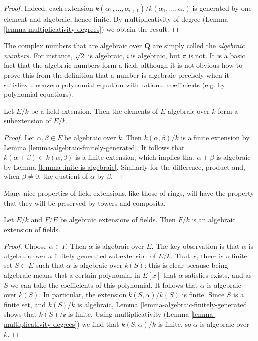\begin{proof}
Indeed, each extension
$k(\alpha_{1}, \ldots, \alpha_{i+1})/k(\alpha_1, \ldots, \alpha_{i})$
is generated by one element and algebraic, hence finite.
By multiplicativity of degree (Lemma \ref{lemma-multiplicativity-degrees})
we obtain the result.
\end{proof}

\noindent
The complex numbers that are algebraic over $\mathbf{Q}$ are simply
called the {\it algebraic numbers.} For instance, $\sqrt{2}$ is algebraic,
$i$ is algebraic, but $\pi$ is not.
It is a basic fact that the algebraic numbers form a field, although it is not
obvious how to prove this from the definition that a number is algebraic
precisely when it satisfies a nonzero polynomial equation with rational
coefficients (e.g. by polynomial equations).

\begin{lemma}
\label{lemma-algebraic-elements}
Let $E/k$ be a field extension. Then the elements of $E$ algebraic over $k$
form a subextension of $E/k$.
\end{lemma}

\begin{proof}
Let $\alpha, \beta \in E$ be algebraic over $k$. Then $k(\alpha, \beta)/k$
is a finite extension by Lemma \ref{lemma-algebraic-finitely-generated}.
It follows that $k(\alpha + \beta) \subset k(\alpha, \beta)$ is a finite
extension, which implies that $\alpha + \beta$ is algebraic by
Lemma \ref{lemma-finite-is-algebraic}. Similarly for the difference,
product and, when $\beta \not = 0$, the quotient of $\alpha$ by $\beta$.
\end{proof}

\noindent
Many nice properties of field extensions, like those of rings, will have the
property that they will be preserved by towers and composita.

\begin{lemma}
\label{lemma-algebraic-permanence}
Let $E/k$ and $F/E$ be algebraic extensions of fields. Then $F/k$ is an
algebraic extension of fields.
\end{lemma}

\begin{proof}
Choose $\alpha \in F$. Then $\alpha$ is algebraic over $E$.
The key observation is that $\alpha$ is algebraic over a
finitely generated subextension of $E/k$.
That is, there is a finite set $S \subset E$ such that $\alpha $ is algebraic
over $k(S)$: this is clear because being algebraic means that a certain
polynomial in $E[x]$ that $\alpha$ satisfies exists, and as $S$ we can take the
coefficients of this polynomial. It follows that $\alpha$ is algebraic over
$k(S)$. In particular, the extension $k(S, \alpha)/ k(S)$ is finite.
Since $S$ is a finite set, and $k(S)/k$ is algebraic,
Lemma \ref{lemma-algebraic-finitely-generated} shows that
$k(S)/k$ is finite. Using multiplicativity
(Lemma \ref{lemma-multiplicativity-degrees})
we find that $k(S,\alpha)/k$ is finite, so $\alpha$ is algebraic over $k$.
\end{proof}

